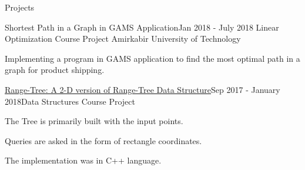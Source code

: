 \documentclass{resume} %
\begin{document}
\begin{rSection}{Projects}
		
		\begin{rSubsection}{Shortest Path in a Graph in GAMS Application}{Jan 2018 - July 2018}{
				Linear Optimization Course Project }{Amirkabir University of Technology}
			\item Implementing a program in GAMS application to find the most optimal path in a graph for product shipping.
			
		\end{rSubsection}
		
		
		\begin{rSubsection}{\href{https://github.com/pouyaaghahoseini/DS-Course}{Range-Tree: A 2-D version of Range-Tree Data Structure}}{Sep 2017 - January 2018}{Data Structures Course Project}{ }
			\item The Tree is primarily built with the input points.
			\item Queries are asked in the form of rectangle coordinates. 
			\item The implementation was in C++ language.
			
		\end{rSubsection}
		
		
		
	\end{rSection}
\end{document}
